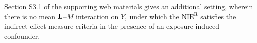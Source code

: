 \documentclass[12pt]{article}
\newtheorem{theorem}{Theorem}
\begin{document}
Section S3.1 of the supporting web materials gives an additional setting, wherein there is no mean ${\bf L}$--$M$ interaction on $Y$, under which the $\text{NIE}^{\mathrm{R}}$ satisfies the indirect effect measure criteria in the presence of an exposure-induced confounder.

\begin{comment}
An assumption under which satisfaction of the sharp null, sharper null, and monotonicity criteria is recovered is that there is no mean ${\bf L}$--$M$ interaction on $Y$ on the additive scale, i.e., 
\[E(Y\mid m', {\boldsymbol \ell'}, a', {\bf C}) - E(Y\mid m', {\boldsymbol \ell''}, a', {\bf C}) = E(Y\mid m'', {\boldsymbol \ell'}, a', {\bf C}) - E(Y\mid m'', {\boldsymbol \ell''}, a', {\bf C})\]
almost surely for all $a'$, ${\boldsymbol \ell'}$, ${\boldsymbol \ell''}$, $m'$, and $m''$. \cite{tchetgen2014identification} showed that the NIE is nonparametrically identified under this assumption even in the presence of an exposure-induced confounder.
\begin{theorem}
    \label{thm:no-LM-interaction}
    Suppose there is no mean interaction between ${\bf L}$ and $M$ on $Y$ on the additive scale. Then under the NPSEM-IE corresponding to the DAG in Figure \ref{fig:DAG2} and Assumption \ref{assn:positivity}, $\text{NIE}^{\mathrm{R}}=\text{NIE}$, and both satisfy the indirect effect measure criteria.
\end{theorem}

While satisfaction of these criteria is recovered for the NIE$^{\text{R}}$ under these assumptions, they also suffice to nonparametrically identify the NIE. Thus, under such settings, the NIE$^{\text{R}}$ does not appear to offer a clear advantage over the NIE in terms of quantifying a mediated effect.

\cite{rudolph2018robust} considered estimation of the NIE$^{\text{R}}$ in the presence of an exposure-induced confounder under an instrumental variable-like setting in which the exposure has no direct effect on the mediator with respect to the exposure-induced confounder. That is, $A$ is playing the role of an instrumental variable with respect to studying the effect of $\bf L$ on $M$. The counterexample in the proof of Theorem \ref{thm:recanting-SNC} does not belong to this model, as $A$ does have a direct effect on $M$ with respect to $L$, hence it is unclear whether the NIE$^{\text{R}}$ will satisfy the sharp(er) null criterion in such a setting. This is an interesting open question worth exploring.
\end{comment}
\end{document}
